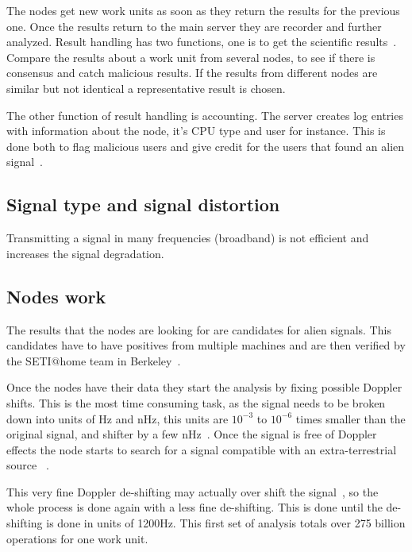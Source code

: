 The nodes get new work units as soon as they return the results for the 
previous one. Once the results return to the main server they are recorder 
and further analyzed. Result handling has two functions, one is to 
get the scientific results~\cite{hid-sp18-601-paper-anderson2002seti}. 
Compare the results about a work unit from several nodes, to see if there 
is consensus and catch malicious results. 
If the results from different nodes are similar but not identical a 
representative result is chosen.

The other function of result handling is accounting. The server creates 
log entries with information about the node, it's CPU type and user for 
instance. This is done both to flag malicious users and give credit for
the users that found an alien signal~\cite{hid-sp18-601-paper-anderson2002seti}.

\subsection{Signal type and signal distortion}

Transmitting a signal in many frequencies (broadband) is not efficient and increases the signal degradation.

\subsection{Nodes work}
\label{hid-sp18-601-subsection-nodes-work}
The results that the nodes are looking for are candidates for alien signals.
This candidates have to have positives from multiple machines and are then 
verified by the SETI$@$home team in 
Berkeley~\cite{hid-sp18-601-www-sathome-howworks}.

Once the nodes have their data they start the analysis by fixing possible 
Doppler shifts. This is the most time consuming task, as the signal needs to be 
broken down into units of Hz and nHz, this units are $10^{-3}$ to $10^{-6}$ 
times smaller than the original signal, and shifter by a few 
nHz~\cite{hid-sp18-601-www-sathome-howworks}. Once the signal is free of Doppler
 effects the node starts to search for a signal compatible with an 
extra-terrestrial source
~\cite{hid-sp18-601-www-sathome-howworks,hid-sp18-601-paper-cocconi1959searching}.

This very fine Doppler de-shifting may actually over shift the 
signal~\cite{hid-sp18-601-www-sathome-howworks}, so the whole
process is done again with a less fine de-shifting. This is done until the 
de-shifting
is done in units of 1200Hz. This first set of analysis totals over 275 billion 
operations for one work unit.

